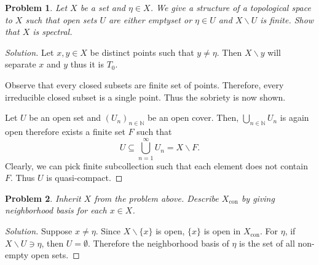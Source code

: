 \documentclass[8pt]{article}
\numberwithin{equation}{section}
\newenvironment{solution}{\begin{proof}[Solution]}{\end{proof}}
\newtheorem{problem}{Problem}[section]
\DeclareMathOperator{\con}{con}
\newcommand{\N}[0]{\mathbb{N}}
\begin{document}
\begin{problem}
  Let $X$ be a set and $\eta\in X$. We give a structure of a topological space to $X$ such that open sets $U$ are either emptyset or $\eta\in U$ and $X\backslash U$ is finite. Show that $X$ is spectral.
\end{problem}
\begin{solution}
  Let $x,y\in X$ be distinct points such that $y\not=\eta$. Then $X\backslash y$ will separate $x$ and $y$ thus it is $T_0$.
  \par Observe that every closed subsets are finite set of points. Therefore, every irreducible closed subset is a single point. Thus the sobriety is now shown. 
  \par Let $U$ be an open set and $(U_n)_{n\in \N}$ be an open cover. Then, $\bigcup_{n\in\N}U_n$ is again open therefore exists a finite set $F$ such that 
  \begin{equation*}
    U\subseteq\bigcup_{n=1}^\infty U_n =X\backslash F.
  \end{equation*}
  Clearly, we can pick finite subcollection such that each element does not contain $F$. Thus $U$ is quasi-compact.
\end{solution}
\begin{problem}
  Inherit $X$ from the problem above. Describe $X_{\con}$ by giving neighborhood basis for each $x\in X$.
\end{problem}
\begin{solution}
  Suppose $x\not=\eta$. Since $X\backslash\{x\}$ is open, $\{x\}$ is open in $X_{\con}$. For $\eta$, if $X\backslash U\ni \eta$, then $U=\emptyset$. Therefore the neighborhood basis of $\eta$ is the set of all non-empty open sets.
\end{solution}
\end{document}

